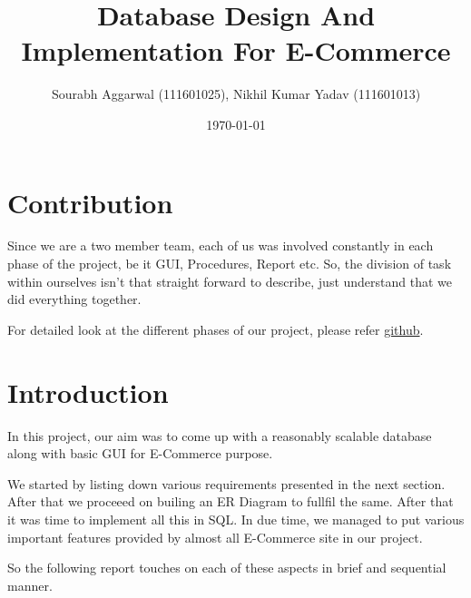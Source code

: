 \documentclass[a4paper,12pt]{article}
\begin{document}
\title{Database Design And Implementation For E-Commerce}
\author{\small{Sourabh Aggarwal (111601025), Nikhil Kumar Yadav (111601013)}}
\date{\today}
\maketitle
{}
\tableofcontents
\newpage
{}

\section{Contribution}
Since we are a two member team, each of us was involved constantly in each phase of the project, be it GUI, Procedures, Report etc. So, the division of task within ourselves isn't that straight forward to describe, just understand that we did everything together.

For detailed look at the different phases of our project, please refer \href{https://github.com/nikhilyadv/DBMS-Lab-Project/commits/master}{github}.


\section{Introduction}
In this project, our aim was to come up with a reasonably scalable database along with basic GUI for E-Commerce purpose.

We started by listing down various requirements presented in the next section. After that we proceeed on builing an ER Diagram to fullfil the same. After that it was time to implement all this in SQL. In due time, we managed to put various important features provided by almost all E-Commerce site in our project. 

So the following report touches on each of these aspects in brief and sequential manner. 
\end{document}

